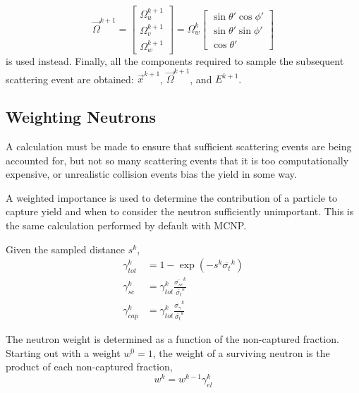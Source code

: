 \begin{equation}
        \overrightarrow{\Omega}^{k+1} = \begin{bmatrix}
        \Omega^{k+1}_u \\[8pt]
        \Omega^{k+1}_v \\[8pt]
        \Omega^{k+1}_w
    \end{bmatrix} = \Omega_w^k     \begin{bmatrix}
        \sin{\theta'}\cos{\phi'} \\[8pt]
        \sin{\theta'}\sin{\phi'} \\[8pt]
        \cos{\theta'}
    \end{bmatrix}
\end{equation}
is used instead. Finally, all the components required to sample the subsequent scattering event are obtained: $\overrightarrow{x}^{k+1}$, $\overrightarrow{\Omega}^{k+1}$, and $E^{k+1}$.

\subsection{Weighting Neutrons}
\label{ssec:killing-neutrons-ms}
A calculation must be made to ensure that sufficient scattering events are being accounted for, but not so many scattering events that it is too computationally expensive, or unrealistic collision events bias the yield in some way.

A weighted importance is used to determine the contribution of a particle to capture yield and when to consider the neutron sufficiently unimportant. This is the same calculation performed by default with MCNP\cite{mcnp}. 

Given the sampled distance $s^{k}$,
\begin{align}
    \label{eq:tot-frac}
    \gamma_{tot}^{k} &=  1 - \exp{ \left(-s^{k} \overline{\sigma_{t}}^{k} \right)} \\
    \label{eq:el-frac}
    \gamma_{sc}^{k} &= \gamma_{tot}^{k} \frac{\overline{\sigma_{sc}}^{k}} {\overline{\sigma_{t}}^{k}} \\
    \label{eq:cap-frac}
    \gamma_{cap}^{k} &= \gamma_{tot}^{k} \frac{\overline{\sigma_{\gamma}}^{k}}{\overline{\sigma_{t}}^{k}}
\end{align}

The neutron weight is determined as a function of the non-captured fraction. Starting out with a weight $w^{0}=1$, the weight of a surviving neutron is the product of each non-captured fraction,
\begin{equation}
    \label{eq:neutron-weight}
    w^{k} = w^{k-1}\gamma_{el}^{k}
\end{equation}

